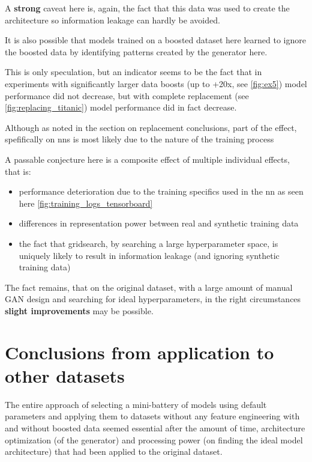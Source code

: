 A \textbf{strong} caveat here is, again, the fact that this data was used to create the architecture so information leakage can hardly be avoided.

It is also possible that models trained on a boosted dataset here learned to ignore the boosted data by identifying patterns created by the generator here. 

This is only speculation, but an indicator seems to be the fact that in experiments with significantly larger data boosts (up to +20x, see \ref{fig:ex5}) model performance did not decrease, but with complete replacement (see \ref{fig:replacing_titanic}) model performance did in fact decrease. 

Although as noted in the section on replacement conclusions, part of the effect, spefifically on \acp{nn} is most likely due to the nature of the training process

\pagebreak

A passable conjecture here is a composite effect of multiple individual effects, that is: 

\begin{itemize}
	\item performance deterioration due to the training specifics used in the \ac{nn} as seen here \ref{fig:training_logs_tensorboard}
	\item differences in representation power between real and synthetic training data
	\item the fact that gridsearch, by searching a large hyperparameter space, is uniquely likely to result in information leakage (and ignoring synthetic training data)
\end{itemize}

The fact remains, that on the original dataset, with a large amount of manual \ac{GAN} design and searching for ideal hyperparameters, in the right circumstances \textbf{slight improvements} may be possible.

\pagebreak

\section{Conclusions from application to other datasets}

The entire approach of selecting a mini-battery of models using default parameters and applying them to datasets without any feature engineering with and without boosted data seemed essential after the amount of time, architecture optimization (of the generator) and processing power (on finding the ideal model architecture) that had been applied to the original dataset.

